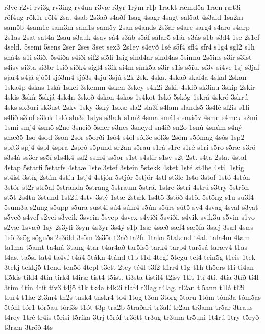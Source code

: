 {r3ve
r2vi
rvi3g
rv3ing
rv4un
r3væ
r3yr
1rým
r1þ
1rækt
ræmd5a
1ræn
ræt3i
röf4ug
rök1r
röl4
2sa.
4sab
2s3að
s4aðf
1sag
4sagr
4sagt
sal5at
4s3ald
1sa2m
sam5b
4sam1e
sam3m
sam1s
sam5y
2san
s4ands
2s3ar
s4are
sarg4
s4aro
s4arp
2s1as
2sat
sat4a
2sau
s3auk
4sav
sá4
s3áb
s5áf
sálar5
s1ár
s3ás
s1b
s3d4
1se
2s1ef
4seld.
5semi
5sens
2ser
2ses
3set
sex3
2s1ey
s4eyð
1sé
s5f4
sfl4
sfr4
s1g4
sgl2
s1h
shá4s
s1i
s3ið.
5s4iða
s4iði
sif2
si5fi
1sig
sind4ar
sind4as
5sinnu
2s5ins
s3ir
s3ist
s4isv
si3ta
sí3br
1síð
síðk4
sígl4
s3ík
sí4m
sínk5a
s3ír
s1ís
s5íu.
sí3v
sí4ve
1sj
s3jaf
sjar4
s4já
sjó5l
sjó3m4
sjó3s
4sju
3sjú
s2k
2sk.
4ska.
4skað
skaf4a
4skal
2skan
1ska4p
4skas
1ská
1skei
3skemm
4sken
3skey
s4k2i
2ski.
4skið
sk3inu
3skip
2skir
4skis
3skír
5skjá
4sk4n
3skoð
4skon
4skos
1s4kot
1skó
5skóg
1skrá
4skró
3skrú
4sks
sk3uri
sk3ust
2skv
1sky
3ský
1skæ
sla2
sla3f
s4lam
slands5
3s4lé
sl2is
s1lí
s4líð
s3lof
s3lok
1sló
slu3s
1slys
s3læk
s1m2
4sma
smá1s
smá5v
4sme
s4mek
s2mi
1smí
smj4
4smö
s2ne
3sneið
5sner
s3nes
3sneyd
sn4ið
sn2o
1snú
4snúm
s4ný
snæð5
1so
4sod
3son
2sor
s5orði
1só4
s4ól
sól3e
sól3s
2sóm
s5ómag
4sós
1sp2
spít3
spj4
4spl
4spra
2spró
s5pund
sr2an
s5rau
s1rá
s1re
s1ré
s1rí
s5ro
s5ræ
s3rö
s3s4á
ss3er
ss5í
s1s4k4
ssl2
ssm4
ss5or
s1st
s4stir
s1sv
s2t
2st.
s4ta
2sta.
4stal
4stap
5starfi
5starfs
4staæ
1ste
3stef
3stein
5stekk
4stet
1sté
st4he
4sti.
1stig
st4isl
3stíg
2stím
4stíu
1stj4
4stjón
5stjór
5stjör
4stl
st3le
1sto
3stof
1stó
4stón
3stór
st2r
str5al
5stranda
5strang
5straum
5strá.
1stre
3strí
4strú
s3try
5strön
st5t
2s4tu
3stund
1st2ú
4stv
3stý
1stæ
2stæk
1s4tö
3stöð
4stöl
5stöng
s1u
su3f4
5sum3a
s2ung
s5upp
s5ura
sust4i
sú4
súln4
s5ún
s5úrs
sút5
sv4
4svag
4sval
s3vat
s5veð
s4vef
s2vei
s3veik
3svein
5svep
4svex
s4viði
5sviði.
s4vik
svik3u
s5vin
s1vo
s2væ
1svæð
1sy
2s3yfi
3syn
4s3yr
3s4ý
s1þ
1sæ
4sæð
sæf4
sæ5fa
3sæj
3sæl
4sæs
1sö
3sög
sögu5s
2s3öld
3söm
2s3ör
t2að
ta2fr
1taka
5takend
t4al.
tala4m
4tam
ta1ma
t5amt
ta4ná
3tang
4tar
t4ar4að
tar5is5
tark4
tarp4
tar5sá
taræv4
t1as
t4as.
ta5sl
tat4
ta4ví
t4á4
5tákn
4tánd
t1b
t1d
4tegí
5tegu
tei4
tein5g
t1eis
1tek
3tekj
tekkj5
t1end
ten5ó
4tepl
t3ett
2tey
té4l
t3f2
tfirr4
t1g
t1h
th5ers
t1i
ti4an
ti5kis
tild4
4tin
tirk4
t4iræ
tist4
t5ist.
ti3sta
tistil4
t2isv
1tit
1tí
4tí.
4tía
3tíð
tí4l
3tím
4tín
4tít
tív3
t4jö
t1k
tk4a
t4k2i
tlaf4
t3lag
t4lag.
tl2an
tl5ann
t1lá
tl2i
tlur4
t1læ
2t3m4
tn2s
tnsk4
tnskr4
to4
1tog
t3on
3torg
5toru
1tóm
tóm3a
tóm5as
5tónl
tór1
tór5au
tóri3s
t1ót
t3p
tra2b
5traðari
tr3alí
tr2an
tr3ann
tr5ar
3traus
t4rey
1tré
tr4is
t5risi
t5ríka
3trj
t5róf
tr3ótt
tr3ug
tr3una
tr5uni
1t4rú
1try
t5ryð
t3ræn
3tröð
4ts
}

